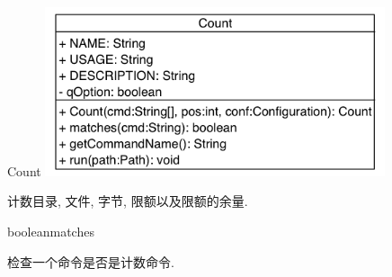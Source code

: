 \begin{XeClass}{Count}
\includegraphics[width=10cm]{cdig/Count.png}
     
 计数目录, 文件, 字节, 限额以及限额的余量.

    \begin{XeMethod}{\XePublic}{boolean}{matches}
         
 检查一个命令是否是计数命令.

    \end{XeMethod}

\end{XeClass}
